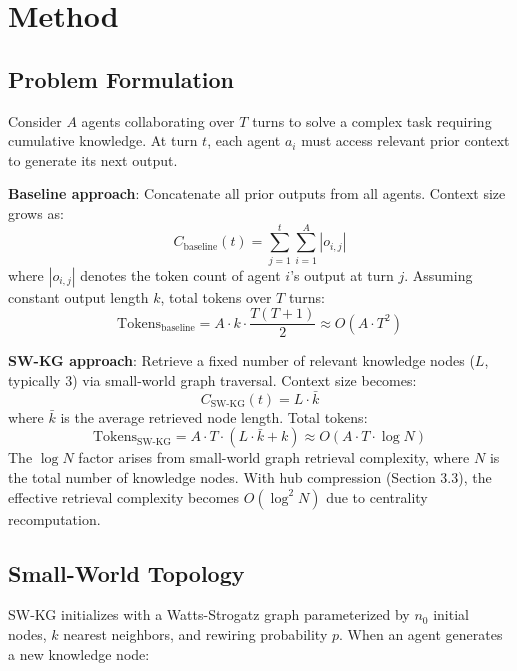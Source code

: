 \documentclass[11pt]{article}
\begin{document}
\section{Method}

\subsection{Problem Formulation}

Consider $A$ agents collaborating over $T$ turns to solve a complex task requiring cumulative knowledge. At turn $t$, each agent $a_i$ must access relevant prior context to generate its next output. 

\textbf{Baseline approach}: Concatenate all prior outputs from all agents. Context size grows as:
\begin{equation}
C_{\text{baseline}}(t) = \sum_{j=1}^{t} \sum_{i=1}^{A} |o_{i,j}|
\end{equation}
where $|o_{i,j}|$ denotes the token count of agent $i$'s output at turn $j$. Assuming constant output length $k$, total tokens over $T$ turns:
\begin{equation}
\text{Tokens}_{\text{baseline}} = A \cdot k \cdot \frac{T(T+1)}{2} \approx O(A \cdot T^2)
\end{equation}

\textbf{SW-KG approach}: Retrieve a fixed number of relevant knowledge nodes ($L$, typically 3) via small-world graph traversal. Context size becomes:
\begin{equation}
C_{\text{SW-KG}}(t) = L \cdot \bar{k}
\end{equation}
where $\bar{k}$ is the average retrieved node length. Total tokens:
\begin{equation}
\text{Tokens}_{\text{SW-KG}} = A \cdot T \cdot (L \cdot \bar{k} + k) \approx O(A \cdot T \cdot \log N)
\end{equation}
The $\log N$ factor arises from small-world graph retrieval complexity, where $N$ is the total number of knowledge nodes. With hub compression (Section 3.3), the effective retrieval complexity becomes $O(\log^2 N)$ due to centrality recomputation.

\subsection{Small-World Topology}

SW-KG initializes with a Watts-Strogatz graph \cite{watts1998} parameterized by $n_0$ initial nodes, $k$ nearest neighbors, and rewiring probability $p$. When an agent generates a new knowledge node:
\end{document}
